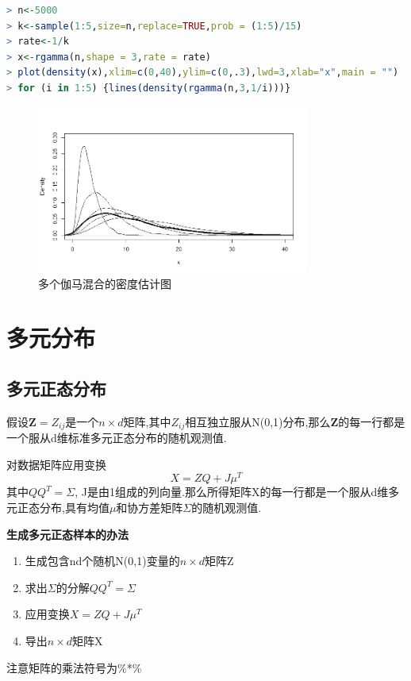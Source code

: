 \documentclass[11pt,a4paper,oneside]{book}
\begin{document}
\begin{lstlisting}[language=r]
> n<-5000
> k<-sample(1:5,size=n,replace=TRUE,prob = (1:5)/15)
> rate<-1/k
> x<-rgamma(n,shape = 3,rate = rate)
> plot(density(x),xlim=c(0,40),ylim=c(0,.3),lwd=3,xlab="x",main = "")
> for (i in 1:5) {lines(density(rgamma(n,3,1/i)))}
\end{lstlisting}
\begin{figure}[H]
	\centering
	\includegraphics[width=0.8\textwidth]{9.png}
	\caption{多个伽马混合的密度估计图}
\end{figure}

\section{多元分布}
\subsection{多元正态分布}
假设$ \textbf{Z}=Z_{ij} $是一个$ n\times d $矩阵,其中$ Z_{ij} $相互独立服从N(0,1)分布,那么$ \textbf{Z}$的每一行都是一个服从d维标准多元正态分布的随机观测值.

对数据矩阵应用变换$$X=ZQ+J\mu^T$$
其中$ QQ^T=\Sigma $, J是由1组成的列向量.那么所得矩阵X的每一行都是一个服从d维多元正态分布,具有均值$ \mu $和协方差矩阵$ \Sigma $的随机观测值.

\begin{tcolorbox}[colback=blue!7!white,colframe=blue!40]
\textbf{生成多元正态样本的办法}
\begin{enumerate}
	\item 生成包含nd个随机N(0,1)变量的$ n\times d $矩阵Z
	\item 求出$ \Sigma $的分解$ QQ^T=\Sigma $
	\item 应用变换$X=ZQ+J\mu^T$
	\item 导出$ n\times d $矩阵X
\end{enumerate}
\end{tcolorbox}
\begin{tcolorbox}[colback=pink!10!white,colframe=pink!100!black]
	注意矩阵的乘法符号为\%*\%
\end{tcolorbox}
\end{document}
